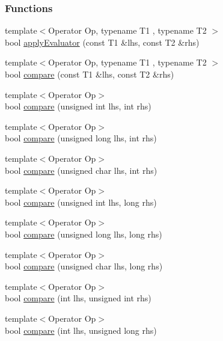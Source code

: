 \subsubsection*{Functions}
\begin{DoxyCompactItemize}
\item 
{\footnotesize template$<$Operator Op, typename T1 , typename T2 $>$ }\\bool \hyperlink{namespaceCatch_1_1Internal_a89cce18df5d024cb5ede10fa26fc41c3}{apply\-Evaluator} (const T1 \&lhs, const T2 \&rhs)
\item 
{\footnotesize template$<$Operator Op, typename T1 , typename T2 $>$ }\\bool \hyperlink{namespaceCatch_1_1Internal_a951491ff5ed9c93dcd5871fafafb86d8}{compare} (const T1 \&lhs, const T2 \&rhs)
\item 
{\footnotesize template$<$Operator Op$>$ }\\bool \hyperlink{namespaceCatch_1_1Internal_a171aec1826898b877980a2b15fe5f735}{compare} (unsigned int lhs, int rhs)
\item 
{\footnotesize template$<$Operator Op$>$ }\\bool \hyperlink{namespaceCatch_1_1Internal_aa2698c33ec87b16aff5c844165483a7a}{compare} (unsigned long lhs, int rhs)
\item 
{\footnotesize template$<$Operator Op$>$ }\\bool \hyperlink{namespaceCatch_1_1Internal_ad68724393ee3d7629001a2997f6134cc}{compare} (unsigned char lhs, int rhs)
\item 
{\footnotesize template$<$Operator Op$>$ }\\bool \hyperlink{namespaceCatch_1_1Internal_ac2af7b6757f9bb3539bb78acff5c4649}{compare} (unsigned int lhs, long rhs)
\item 
{\footnotesize template$<$Operator Op$>$ }\\bool \hyperlink{namespaceCatch_1_1Internal_ace20062a489a8a7049fe224d62e644a7}{compare} (unsigned long lhs, long rhs)
\item 
{\footnotesize template$<$Operator Op$>$ }\\bool \hyperlink{namespaceCatch_1_1Internal_a640e0cce9260a912842bee58db501dc5}{compare} (unsigned char lhs, long rhs)
\item 
{\footnotesize template$<$Operator Op$>$ }\\bool \hyperlink{namespaceCatch_1_1Internal_a17c92ed4b6d88a9f8bbcbc52544fe40f}{compare} (int lhs, unsigned int rhs)
\item 
{\footnotesize template$<$Operator Op$>$ }\\bool \hyperlink{namespaceCatch_1_1Internal_aac7a6452ed0d324031ceb7b4f3a3b61c}{compare} (int lhs, unsigned long rhs)

\end{DoxyCompactItemize}
